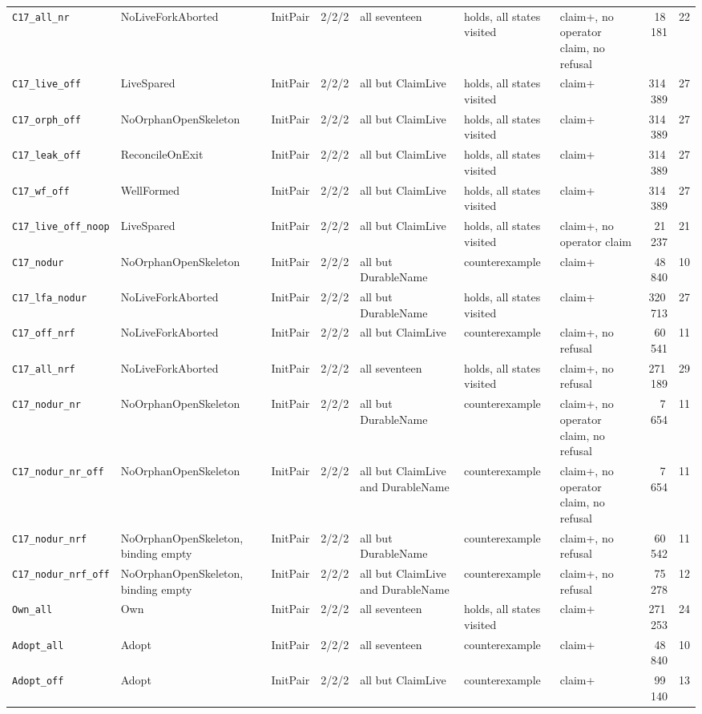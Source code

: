 \documentclass[a4paper,10pt,fleqn]{article}
\begin{document}
{\begin{center}
\begin{tabularx}{\textwidth}{@{}l l l l X X l r r@{}}
\texttt{C17\_all\_nr} & NoLiveForkAborted & InitPair & 2/2/2 & all seventeen & holds, all states visited & claim+, no operator claim, no refusal & 18\,181 & 22 \\
\texttt{C17\_live\_off} & LiveSpared & InitPair & 2/2/2 & all but ClaimLive & holds, all states visited & claim+ & 314\,389 & 27 \\
\texttt{C17\_orph\_off} & NoOrphanOpenSkeleton & InitPair & 2/2/2 & all but ClaimLive & holds, all states visited & claim+ & 314\,389 & 27 \\
\texttt{C17\_leak\_off} & ReconcileOnExit & InitPair & 2/2/2 & all but ClaimLive & holds, all states visited & claim+ & 314\,389 & 27 \\
\texttt{C17\_wf\_off} & WellFormed & InitPair & 2/2/2 & all but ClaimLive & holds, all states visited & claim+ & 314\,389 & 27 \\
\texttt{C17\_live\_off\_noop} & LiveSpared & InitPair & 2/2/2 & all but ClaimLive & holds, all states visited & claim+, no operator claim & 21\,237 & 21 \\
\texttt{C17\_nodur} & NoOrphanOpenSkeleton & InitPair & 2/2/2 & all but DurableName & counterexample & claim+ & 48\,840 & 10 \\
\texttt{C17\_lfa\_nodur} & NoLiveForkAborted & InitPair & 2/2/2 & all but DurableName & holds, all states visited & claim+ & 320\,713 & 27 \\
\texttt{C17\_off\_nrf} & NoLiveForkAborted & InitPair & 2/2/2 & all but ClaimLive & counterexample & claim+, no refusal & 60\,541 & 11 \\
\texttt{C17\_all\_nrf} & NoLiveForkAborted & InitPair & 2/2/2 & all seventeen & holds, all states visited & claim+, no refusal & 271\,189 & 29 \\
\texttt{C17\_nodur\_nr} & NoOrphanOpenSkeleton & InitPair & 2/2/2 & all but DurableName & counterexample & claim+, no operator claim, no refusal & 7\,654 & 11 \\
\texttt{C17\_nodur\_nr\_off} & NoOrphanOpenSkeleton & InitPair & 2/2/2 & all but ClaimLive and DurableName & counterexample & claim+, no operator claim, no refusal & 7\,654 & 11 \\
\texttt{C17\_nodur\_nrf} & NoOrphanOpenSkeleton, binding empty & InitPair & 2/2/2 & all but DurableName & counterexample & claim+, no refusal & 60\,542 & 11 \\
\texttt{C17\_nodur\_nrf\_off} & NoOrphanOpenSkeleton, binding empty & InitPair & 2/2/2 & all but ClaimLive and DurableName & counterexample & claim+, no refusal & 75\,278 & 12 \\
\texttt{Own\_all} & Own & InitPair & 2/2/2 & all seventeen & holds, all states visited & claim+ & 271\,253 & 24 \\
\texttt{Adopt\_all} & Adopt & InitPair & 2/2/2 & all seventeen & counterexample & claim+ & 48\,840 & 10 \\
\texttt{Adopt\_off} & Adopt & InitPair & 2/2/2 & all but ClaimLive & counterexample & claim+ & 99\,140 & 13 \\
\bottomrule
\end{tabularx}
\end{center}
}
\end{document}
